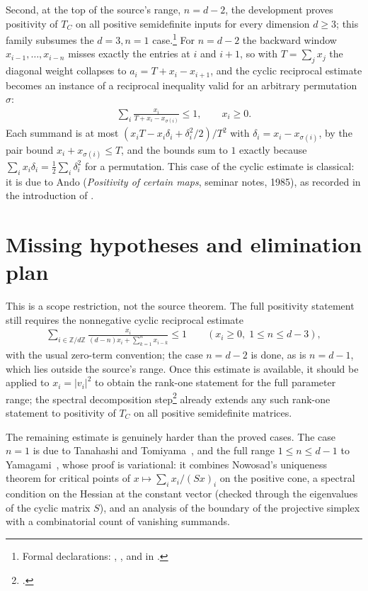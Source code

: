 \documentclass{article}
\begin{document}
Second, at the top of the source's range, \(n=d-2\), the development proves
positivity of \(T_C\) on all positive semidefinite inputs for every dimension
\(d\ge3\); this family subsumes the \(d=3,n=1\)
case.\footnote{Formal declarations:
,
, and
 in
.}  For \(n=d-2\) the backward window
\(x_{i-1},\dots,x_{i-n}\) misses exactly the entries at \(i\) and \(i+1\), so
with \(T=\sum_j x_j\) the diagonal weight collapses to
\(a_i=T+x_i-x_{i+1}\), and the cyclic reciprocal estimate becomes an instance
of a reciprocal inequality valid for an arbitrary permutation \(\sigma\):
\begin{align}
  \sum_i \frac{x_i}{T+x_i-x_{\sigma(i)}}\le 1,
  \qquad x_i\ge 0 .
\end{align}
Each summand is at most \((x_iT-x_i\delta_i+\delta_i^2/2)/T^2\) with
\(\delta_i=x_i-x_{\sigma(i)}\), by the pair bound
\(x_i+x_{\sigma(i)}\le T\), and the bounds sum to \(1\) exactly because
\(\sum_i x_i\delta_i=\tfrac12\sum_i\delta_i^2\) for a permutation.  This case
of the cyclic estimate is classical: it is due to Ando (\emph{Positivity of
certain maps}, seminar notes, 1985), as recorded in the introduction of
\cite{Yamagami1993Cyclic}.

\section{Missing hypotheses and elimination plan}

This is a scope restriction, not the source theorem.  The full positivity
statement still requires the nonnegative cyclic reciprocal estimate
\begin{align}
  \sum_{i\in\mathbb Z/d\mathbb Z}
  \frac{x_i}{(d-n)x_i+\sum_{k=1}^{n}x_{i-k}}\le 1
  \qquad (x_i\ge0,\;1\le n\le d-3),
\end{align}
with the usual zero-term convention; the case \(n=d-2\) is done, as is
\(n=d-1\), which lies outside the source's range.  Once this estimate is
available, it should be applied to \(x_i=|v_i|^2\) to obtain the rank-one
statement for the full parameter range; the spectral decomposition
step\footnote{.}
already extends any such rank-one statement to positivity of \(T_C\) on all
positive semidefinite matrices.

The remaining estimate is genuinely harder than the proved cases.  The case
\(n=1\) is due to Tanahashi and
Tomiyama~\cite{TanahashiTomiyama1988Indecomposable}, and the full range
\(1\le n\le d-1\) to Yamagami~\cite{Yamagami1993Cyclic}, whose proof is
variational: it combines Nowosad's uniqueness theorem for critical points of
\(x\mapsto\sum_i x_i/(Sx)_i\) on the positive cone, a spectral condition on
the Hessian at the constant vector (checked through the eigenvalues of the
cyclic matrix \(S\)), and an analysis of the boundary of the projective
simplex with a combinatorial count of vanishing summands.
\end{document}
